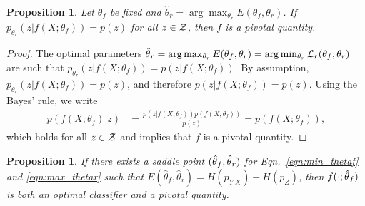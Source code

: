 \documentclass{article}
\theoremstyle{plain}
\newtheorem{proposition}[theorem]{Proposition}
\begin{document}
\begin{proposition}\label{prop:1}
Let $\theta_f$ be fixed and $\hat\theta_r = \arg \max_{\theta_r} E(\theta_f,
\theta_r)$. If $p_{\theta_r}(z|f(X;\theta_f)) = p(z)$
for all $z \in {\cal Z}$, then $f$ is a pivotal quantity.
\end{proposition}

\begin{proof}
The optimal parameters $\smash{\hat\theta}_r =
\arg \max_{\theta_r} E(\theta_f, \theta_r) = \arg \min_{\theta_r} {\cal L}_r(\theta_f,
\theta_r)$ are such that $p_{\theta_r}(z|f(X;\theta_f)) = p(z|f(X;\theta_f))$.
By assumption, $p_{\theta_r}(z|f(X;\theta_f)) = p(z)$,
and therefore $p(z|f(X;\theta_f)) = p(z)$.
Using the Bayes' rule, we write
\begin{align*}
    p(f(X;\theta_f)|z) &= \frac{ p(z|f(X;\theta_f)) p(f(X;\theta_f)) } { p(z)} = p(f(X;\theta_f)),
\end{align*}
which holds for all $z \in {\cal Z}$ and implies that $f$ is a pivotal quantity.
\end{proof}

\begin{proposition}\label{prop:2}
If there exists a saddle point $(\smash{\hat\theta}_f, \smash{\hat\theta}_r)$
for Eqn.~\ref{eqn:min_thetaf} and \ref{eqn:max_thetar} such that
$E(\hat\theta_f, \hat\theta_r) = H(p_{Y|X}) - H(p_Z)$, then
$f(\cdot;\smash{\hat\theta}_f)$ is both an optimal classifier  and a pivotal quantity.
\end{proposition}
\end{document}
